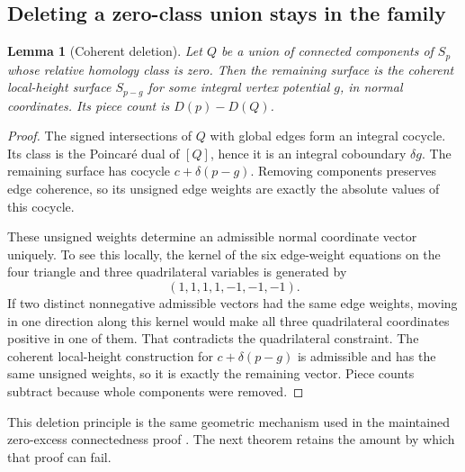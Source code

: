 \documentclass[11pt,letterpaper]{article}
\newtheorem{lemma}[theorem]{Lemma}
\theoremstyle{definition}
\begin{document}
\subsection{Deleting a zero-class union stays in the family}
\begin{lemma}[Coherent deletion]\label{lem:delete}
Let $Q$ be a union of connected components of $S_p$ whose relative homology class is zero. Then the remaining surface is the coherent local-height surface $S_{p-g}$ for some integral vertex potential $g$, in normal coordinates. Its piece count is $D(p)-D(Q)$.
\end{lemma}
\begin{proof}
The signed intersections of $Q$ with global edges form an integral cocycle. Its class is the Poincar\'e dual of $[Q]$, hence it is an integral coboundary $\delta g$. The remaining surface has cocycle $c+\delta(p-g)$. Removing components preserves edge coherence, so its unsigned edge weights are exactly the absolute values of this cocycle.

These unsigned weights determine an admissible normal coordinate vector uniquely. To see this locally, the kernel of the six edge-weight equations on the four triangle and three quadrilateral variables is generated by
\[
 (1,1,1,1,-1,-1,-1).
\]
If two distinct nonnegative admissible vectors had the same edge weights, moving in one direction along this kernel would make all three quadrilateral coordinates positive in one of them. That contradicts the quadrilateral constraint. The coherent local-height construction for $c+\delta(p-g)$ is admissible and has the same unsigned weights, so it is exactly the remaining vector. Piece counts subtract because whole components were removed.
\end{proof}

This deletion principle is the same geometric mechanism used in the maintained zero-excess connectedness proof \cite{connectivity}. The next theorem retains the amount by which that proof can fail.
\end{document}
